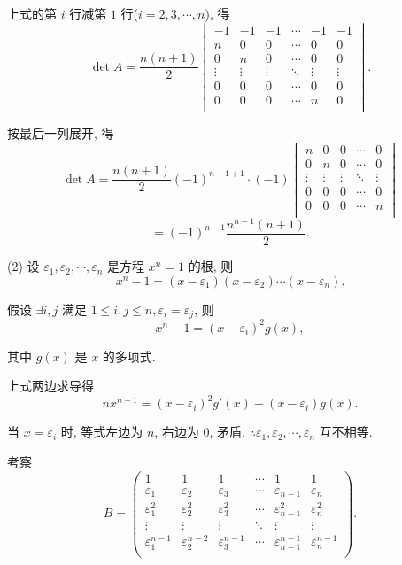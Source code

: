 \documentclass{ctexart}
\begin{document}
\begin{solution}
    上式的第 $i$ 行减第 $1$ 行($i=2,3,\cdots,n$), 得
    \[\det A=\dfrac{n(n+1)}{2}\begin{vmatrix}
        -1 & -1 & -1 & \cdots & -1 & -1 \\
        n & 0 & 0 & \cdots & 0 & 0 \\
        0 & n & 0 & \cdots & 0 & 0 \\
        \vdots & \vdots & \vdots & \ddots &\vdots & \vdots \\
        0 & 0 & 0 & \cdots & 0 & 0 \\
        0 & 0 & 0 & \cdots & n & 0 \\
    \end{vmatrix}.\]

    按最后一列展开, 得
    \[\det A=\dfrac{n(n+1)}{2}(-1)^{n-1+1}\cdot(-1)\begin{vmatrix}
        n & 0 & 0 & \cdots & 0 \\
        0 & n & 0 & \cdots & 0 \\
        \vdots & \vdots & \vdots & \ddots & \vdots \\
        0 & 0 & 0 & \cdots & 0 \\
        0 & 0 & 0 & \cdots & n \\
    \end{vmatrix}\]
    \[=(-1)^{n-1}\dfrac{n^{n-1}(n+1)}{2}.\]

    (2) 设 $\varepsilon_1,\varepsilon_2,\cdots,\varepsilon_n$ 是方程 $x^n=1$ 的根, 则
    \[x^n-1=(x-\varepsilon_1)(x-\varepsilon_2)\cdots(x-\varepsilon_n).\]

    假设 $\exists i,j$ 满足 $1\leq i,j\leq n,\varepsilon_i=\varepsilon_j$, 则
    \[x^n-1=(x-\varepsilon_i)^2g(x),\]

    其中 $g(x)$ 是 $x$ 的多项式.

    上式两边求导得
    \[nx^{n-1}=(x-\varepsilon_i)^2g'(x)+(x-\varepsilon_i)g(x).\]

    当 $x=\varepsilon_i$ 时, 等式左边为 $n$, 右边为 $0$, 矛盾. $\therefore\varepsilon_1,\varepsilon_2,\cdots,\varepsilon_n$ 互不相等.

    考察
    \[B=\begin{pmatrix}
        1 & 1 & 1 & \cdots & 1 & 1 \\
        \varepsilon_1 & \varepsilon_2 & \varepsilon_3 & \cdots & \varepsilon_{n-1} & \varepsilon_n \\
        \varepsilon_1^2 & \varepsilon_2^2 & \varepsilon_3^2 & \cdots & \varepsilon_{n-1}^2 & \varepsilon_n^2 \\
        \vdots & \vdots & \vdots & \ddots & \vdots & \vdots \\
        \varepsilon_1^{n-1} & \varepsilon_2^{n-2} & \varepsilon_3^{n-1} & \cdots & \varepsilon_{n-1}^{n-1} & \varepsilon_n^{n-1} \\
    \end{pmatrix}.\]


\end{solution}
\end{document}
